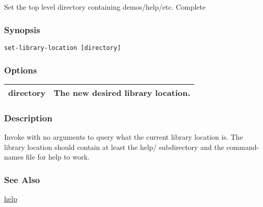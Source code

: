 \subsection{}
\label{set-library-location}
Set the top level directory containing demos/help/etc. 
 Complete
\subsubsection*{Synopsis}
\begin{verbatim}
set-library-location [directory] 
\end{verbatim}
\subsubsection*{Options}
\begin{tabular}{|l|l|}
\hline 
 directory  & The new desired library location.  \\
 \hline 
\end{tabular}
\subsubsection*{Description}
 Invoke with no arguments to query what the current library location is. The library location should contain at least the help/ subdirectory and the command-names file for help to work. 
\subsubsection*{See Also}
\hyperref[help]{help} 